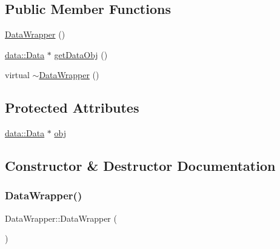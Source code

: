 \subsection*{Public Member Functions}
\begin{DoxyCompactItemize}
\item 
\mbox{\hyperlink{class_data_wrapper_a4fa5d8de610e5b150ef54c7b4d511511}{Data\+Wrapper}} ()
\item 
\mbox{\hyperlink{classdata_1_1_data}{data\+::\+Data}} $\ast$ \mbox{\hyperlink{class_data_wrapper_a5e2993dd02f11ae2da8db95f942eca60}{get\+Data\+Obj}} ()
\item 
virtual \mbox{\hyperlink{class_data_wrapper_a044e31d75a037866939eb60640a6b1be}{$\sim$\+Data\+Wrapper}} ()
\end{DoxyCompactItemize}
\subsection*{Protected Attributes}
\begin{DoxyCompactItemize}
\item 
\mbox{\hyperlink{classdata_1_1_data}{data\+::\+Data}} $\ast$ \mbox{\hyperlink{class_data_wrapper_aa7e20aa2db84194fd86c032583a93774}{obj}}
\end{DoxyCompactItemize}


\subsection{Constructor \& Destructor Documentation}
\mbox{\label{class_data_wrapper_a4fa5d8de610e5b150ef54c7b4d511511}} 
\subsubsection{\texorpdfstring{Data\+Wrapper()}{DataWrapper()}}
{\footnotesize\ttfamily Data\+Wrapper\+::\+Data\+Wrapper (\begin{DoxyParamCaption}{ }\end{DoxyParamCaption})\hspace{0.3cm}{\ttfamily [inline]}}

\mbox{\label{class_data_wrapper_a044e31d75a037866939eb60640a6b1be}} 
